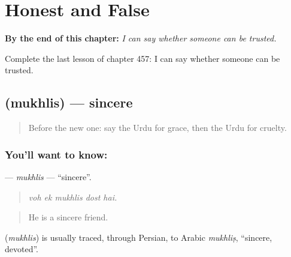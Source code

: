 
\chapter{Honest and False}
\label{ch:ur-honest-and-false}

\begin{chapteropening}
\textbf{By the end of this chapter:} \emph{I can say whether someone can be trusted.}

Complete the last lesson of chapter 457: I can say whether someone can be trusted.
\end{chapteropening}

\section[\texorpdfstring{\ur{مخلص} (mukhlis)}{مخلص (mukhlis)}]{ (mukhlis) — sincere}

\label{lesson:UR-C457-mukhlis}



\begin{quote}
Before the new one: say the Urdu for grace, then the Urdu for cruelty.
\end{quote}

\subsection*{You'll want to know: }
\textbf{} — \emph{mukhlis} — \textquotedblleft{}sincere\textquotedblright{}.

\begin{quote}
    
\end{quote}

\begin{quote}
\emph{voh ek mukhlis dost hai.}
\end{quote}

\begin{quote}
He is a sincere friend.
\end{quote}

\begin{cousinweb}
\textbf{} (\emph{mukhlis}) is usually traced, through Persian, to Arabic \emph{mukhliṣ}, \textquotedblleft{}sincere, devoted\textquotedblright{}.
\end{cousinweb}


